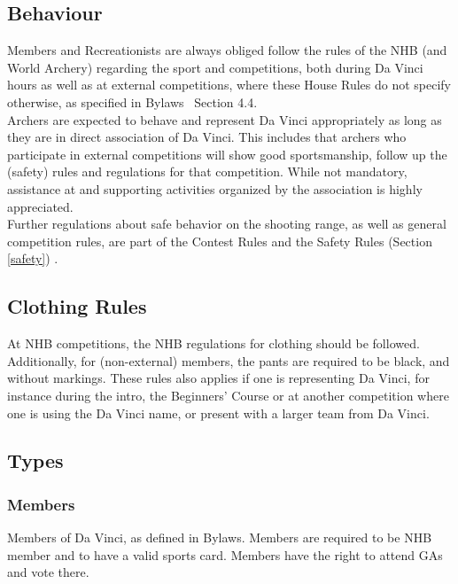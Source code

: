 \documentclass[a4paper]{article}
\newcommand{\Asta}{Bylaws} %
\newcommand{\Asr}{Safety Rules} %
\newcommand{\Awr}{Contest Rules} %
\begin{document}
\subsection{Behaviour}
{ Members} and { Recreationists} are always obliged follow the rules of the { NHB} (and World Archery) regarding the sport and competitions, both during Da Vinci hours as well as at external competitions, where these { House Rules} do not specify otherwise, as specified in { \Asta\ } Section 4.4. \\

{ Archers} are expected to behave and represent Da Vinci appropriately as long as they are in direct association of Da Vinci. This includes that { archers} who participate in external competitions will show good sportsmanship, follow up the (safety) rules and regulations for that competition. While not mandatory, assistance at and supporting activities organized by the association is highly appreciated. \\

Further regulations about safe behavior on the shooting range, as well as general competition rules, are part of the { \Awr} and the { \Asr} (Section \ref{safety}) .

\subsection{Clothing Rules}
\label{section:clubclothing}
At { NHB} competitions, the { NHB} regulations for clothing should be followed. Additionally, for { (non-external) members}, the pants are required to be black, and without markings. These rules also applies if one is representing Da Vinci, for instance during the intro, the {  Beginners' Course} or at another competition where one is using the Da Vinci name, or present with a larger team from Da Vinci. 

\subsection{Types}
\subsubsection{Members}
{ Members} of Da Vinci, as defined in { \Asta}. { Members} are required to be { NHB} member and to have a valid sports card. { Members} have the right to attend { GA}s and vote there.
\end{document}
